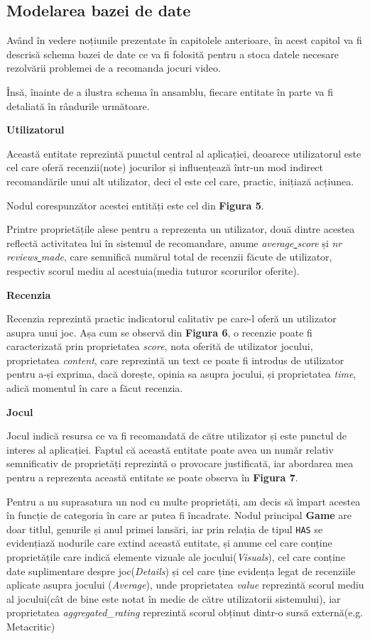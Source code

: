 \documentclass[12pt,a4paper]{report}
\begin{document}
\subsection{Modelarea bazei de date}


Având în vedere noțiunile prezentate în capitolele anterioare, în acest capitol va fi descrisă schema bazei de date ce va fi folosită pentru a stoca datele necesare rezolvării problemei de a recomanda jocuri video.

Însă, înainte de a ilustra schema în ansamblu, fiecare entitate în parte va fi detaliată în rândurile următoare.

\bigskip
\textbf{Utilizatorul}
\bigskip

Această entitate reprezintă punctul central al aplicației, deoarece utilizatorul este cel care oferă recenzii(note) jocurilor și influențează într-un mod indirect recomandările unui alt utilizator, deci el este cel care, practic, inițiază acțiunea.

Nodul corespunzător acestei entități este cel din \textbf{Figura 5}.

Printre proprietățile alese pentru a reprezenta un utilizator, două dintre acestea reflectă activitatea lui în sistemul de recomandare, anume \emph{average\underline{ }score} și \emph{nr\underline{ }reviews\underline{ }made}, care semnifică numărul total de recenzii făcute de utilizator, respectiv scorul mediu al acestuia(media tuturor scorurilor oferite).

\bigskip
\textbf{Recenzia}
\bigskip

Recenzia reprezintă practic indicatorul calitativ pe care-l oferă un utilizator asupra unui joc. Așa cum se observă din 
\textbf{Figura 6}, o recenzie poate fi caracterizată prin proprietatea \emph{score}, nota oferită de utilizator jocului, proprietatea \emph{content}, care reprezintă un text ce poate fi introdus de utilizator pentru a-și exprima, dacă dorește, opinia sa asupra jocului, și proprietatea \emph{time}, adică momentul în care a făcut recenzia.

\bigskip
\textbf{Jocul}
\bigskip

Jocul indică resursa ce va fi recomandată de către utilizator și este punctul de interes al aplicației. Faptul că această entitate poate avea un număr relativ semnificativ de proprietăți reprezintă o provocare justificată, iar abordarea mea pentru a reprezenta această entitate se poate observa în 
\textbf{Figura 7}.


Pentru a nu suprasatura un nod cu multe proprietăți, am decis să împart acestea în funcție de categoria în care ar putea fi încadrate. Nodul principal \textbf{Game} are doar titlul, genurile și anul primei lansări, iar prin relația de tipul \texttt{HAS} se evidențiază nodurile care extind această entitate, și anume cel care conține proprietățile care indică elemente vizuale ale jocului(\emph{Visuals}), cel care conține date suplimentare despre joc(\emph{Details}) și cel care ține evidența legat de recenziile aplicate asupra jocului (\emph{Average}), unde proprietatea \emph{value} reprezintă scorul mediu al jocului(cât de bine este notat în medie de către utilizatorii sistemului), iar proprietatea \emph{aggregated\_rating} reprezintă scorul obținut dintr-o sursă externă(e.g. Metacritic)
\end{document}
